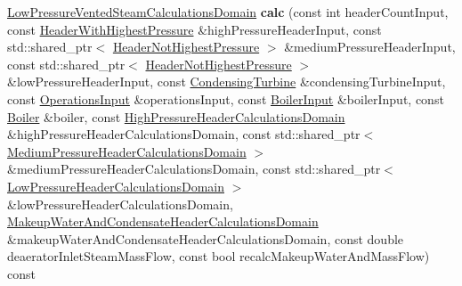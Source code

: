 \begin{DoxyCompactItemize}
\item 
\mbox{\label{class_low_pressure_vented_steam_calculator_adf2f6ad050188e14a900208790571c98}} 
\hyperlink{class_low_pressure_vented_steam_calculations_domain}{Low\+Pressure\+Vented\+Steam\+Calculations\+Domain} {\bfseries calc} (const int header\+Count\+Input, const \hyperlink{class_header_with_highest_pressure}{Header\+With\+Highest\+Pressure} \&high\+Pressure\+Header\+Input, const std\+::shared\+\_\+ptr$<$ \hyperlink{class_header_not_highest_pressure}{Header\+Not\+Highest\+Pressure} $>$ \&medium\+Pressure\+Header\+Input, const std\+::shared\+\_\+ptr$<$ \hyperlink{class_header_not_highest_pressure}{Header\+Not\+Highest\+Pressure} $>$ \&low\+Pressure\+Header\+Input, const \hyperlink{class_condensing_turbine}{Condensing\+Turbine} \&condensing\+Turbine\+Input, const \hyperlink{class_operations_input}{Operations\+Input} \&operations\+Input, const \hyperlink{class_boiler_input}{Boiler\+Input} \&boiler\+Input, const \hyperlink{class_boiler}{Boiler} \&boiler, const \hyperlink{class_high_pressure_header_calculations_domain}{High\+Pressure\+Header\+Calculations\+Domain} \&high\+Pressure\+Header\+Calculations\+Domain, const std\+::shared\+\_\+ptr$<$ \hyperlink{class_medium_pressure_header_calculations_domain}{Medium\+Pressure\+Header\+Calculations\+Domain} $>$ \&medium\+Pressure\+Header\+Calculations\+Domain, const std\+::shared\+\_\+ptr$<$ \hyperlink{class_low_pressure_header_calculations_domain}{Low\+Pressure\+Header\+Calculations\+Domain} $>$ \&low\+Pressure\+Header\+Calculations\+Domain, \hyperlink{class_makeup_water_and_condensate_header_calculations_domain}{Makeup\+Water\+And\+Condensate\+Header\+Calculations\+Domain} \&makeup\+Water\+And\+Condensate\+Header\+Calculations\+Domain, const double deaerator\+Inlet\+Steam\+Mass\+Flow, const bool recalc\+Makeup\+Water\+And\+Mass\+Flow) const
\item 
\mbox{\label{class_low_pressure_vented_steam_calculator_adf2f6ad050188e14a900208790571c98}} 

\end{DoxyCompactItemize}

